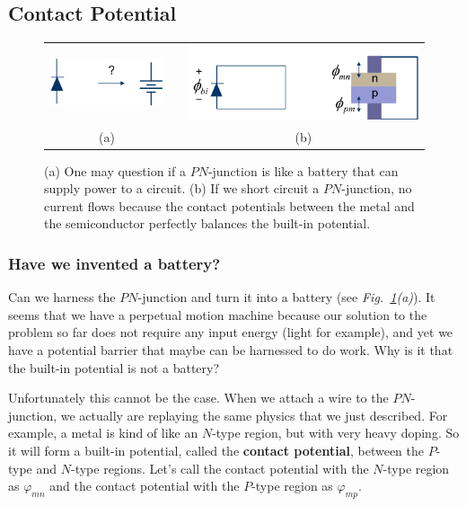 \subsection{Contact Potential}
\begin{figure}[H]
\centering
\begin{tabular}{ccc}
\includegraphics[width=.35\columnwidth]{slide25} & \hspace{.5cm} &
\includegraphics[width=.5\columnwidth]{slide26}\\
(a) &  & (b)\\
\end{tabular}
\caption{(a) One may question if a $PN$-junction is like a battery that can supply power to a circuit.  (b) If we short circuit a $PN$-junction, no current flows because the contact potentials between the metal and the semiconductor perfectly balances the built-in potential. }
\label{fig:slide25_26}
\end{figure}
\subsubsection{Have we invented a battery?}
Can we harness the $PN$-junction and turn it into a battery \big(see \emph{Fig.~\ref{fig:slide25_26}(a)}\big).  It seems that we have a perpetual motion machine because our solution to the problem so far does not require any input energy (light for example), and yet we have a potential barrier that maybe can be harnessed to do work.  Why is it that the built-in potential is not a battery?

Unfortunately this cannot be the case.  When we attach a wire to the $PN$-junction, we actually are replaying the same physics that we just described.  For example, a metal is kind of like an $N$-type region, but with very heavy doping.  So it will form a built-in potential, called the \textbf{contact potential}, between the $P$-type and $N$-type regions.  Let's call the contact potential with the $N$-type region as $\varphi_{mn}$ and the contact potential with the $P$-type region as $\varphi_{mp}$.  

